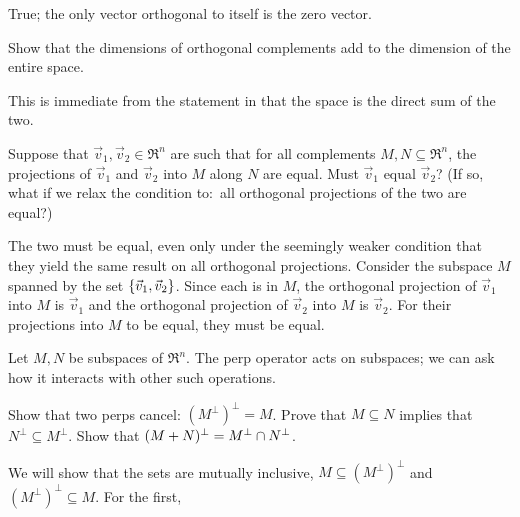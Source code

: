 \begin{exercises}
    \begin{answer}
      True; the only vector orthogonal to itself is the zero vector.
    \end{answer}
  \item 
    Show that the dimensions of orthogonal complements add to the 
    dimension of the entire space.
    \begin{answer}
      This is immediate from the statement in 
       that the space is the direct sum 
      of the two.
    \end{answer}
  \recommended \item
    Suppose that \( \vec{v}_1,\vec{v}_2\in\Re^n \) are such that for all
    complements \( M,N\subseteq\Re^n \), the projections of \( \vec{v}_1 \)
    and \( \vec{v}_2 \) into \( M \) along \( N \) are equal.
    Must \( \vec{v}_1 \) equal \( \vec{v}_2 \)?
    (If so, what if we relax the condition to:~all
     orthogonal projections of the two are equal?)
    \begin{answer}
      The two must be equal, even only under the seemingly weaker
      condition that they yield the same result on all orthogonal projections.
      Consider the subspace $M$ spanned by the set 
      $\mbox{$\{\vec{v}_1,\vec{v}_2\}$}$.
      Since each is in $M$, the orthogonal projection of $\vec{v}_1$ into 
      $M$ is $\vec{v}_1$ and the orthogonal projection of $\vec{v}_2$ into
      $M$ is $\vec{v}_2$.
      For their projections into $M$ to be equal, they must be equal.
    \end{answer}
  \recommended \item \label{exer:AlgOfPerps}
    Let \( M,N \) be subspaces of \( \Re^n \).
    The perp operator acts on subspaces; we can ask how it interacts
    with other such operations.
    \begin{exparts}
      \partsitem Show that two perps cancel: \( (M^\perp)^\perp=M \).
      \partsitem %
        Prove that \( M\subseteq N \) implies
           that \( N^\perp\subseteq M^\perp \).
      \partsitem Show that \( (M+N)^\perp=M^\perp\cap N^\perp \).
    \end{exparts}
    \begin{answer}
      \begin{exparts}
        \partsitem 
          We will show that the sets are mutually inclusive,
          $M\subseteq (M^\perp)^\perp$ and $(M^\perp)^\perp \subseteq M$.
          For the first, 

\end{exparts}
\end{answer}
\end{exercises}
